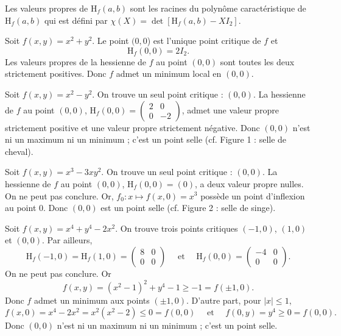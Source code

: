 \documentclass[12pt, class=report,crop=false]{standalone}
\begin{document}
{\vskip6mm

Les valeurs propres de $\mbox{H}_f(a,b)$ sont les racines du polyn\^ome caractéristique de $\mbox{H}_f(a,b)$ qui est défini par $\chi (X)=\det \left[\mbox{H}_f(a,b)-XI_2\right]$.

\vskip6mm

Soit $f(x,y)=x^2+y^2$. Le point $(0,0$) est l'unique point critique de $f$ et
$$\mbox{H}_f(0,0)=2I_2.$$
Les valeurs propres de la hessienne de $f$ au point $(0,0)$ sont toutes les deux strictement positives. Donc $f$ admet un minimum local en $(0,0)$.

\vskip6mm

Soit $f(x,y)=x^2-y^2$. On trouve un seul point critique : $(0,0)$. La hessienne de $f$ au point $(0,0)$, $\mbox{H}_f(0,0)=\left(\begin{array}{cc}2 &0\\ 0&-2\end{array}\right)$, admet une valeur propre strictement positive et une valeur propre strictement négative. Donc $(0,0)$ n'est ni un maximum ni un minimum ; c'est un point selle (cf. Figure 1 : selle de cheval).

\vskip6mm

Soit $f(x,y)=x^3-3xy^2$. On trouve un seul point critique : $(0,0)$. La hessienne de $f$ au point $(0,0)$, $\mbox{H}_f(0,0)=(0)$, a deux valeur propre nulles. On ne peut pas conclure. Or, $f_0:x\mapsto f(x,0)=x^3$ possède un point d'inflexion au point $0$. Donc $(0,0)$ est un point selle (cf. Figure 2 : selle de singe).

\vskip6mm

Soit $f(x,y)=x^4+y^4-2x^2$. On trouve trois points critiques $(-1,0)$, $(1,0)$ et $(0,0)$. Par ailleurs,
$$\mbox{H}_f(-1,0)=\mbox{H}_f(1,0)=\left(\begin{array}{cc}8&0\\ 0&0\end{array}\right)\quad \mbox{ et }\quad \mbox{H}_f(0,0)=\left(\begin{array}{cc}-4&0\\ 0&0\end{array}\right).$$
On ne peut pas conclure. Or
$$f(x,y)=(x^2-1)^2+y^4-1\geq -1=f(\pm 1,0).$$
Donc $f$ admet un minimum aux points $(\pm 1,0)$. D'autre part, pour $|x|\leq 1$,
$$f(x,0)=x^4-2x^2=x^2(x^2-2)\leq 0=f(0,0)\quad \mbox{ et }\quad f(0,y)=y^4\geq 0=f(0,0).$$
Donc $(0,0)$ n'est ni un maximum ni un minimum ; c'est un point selle.

}
\end{document}
